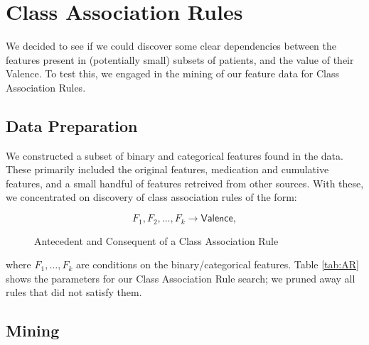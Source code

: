 \chapter{Class Association Rules}\label{sec:assoc-rules} 
 
 We decided to see if we could discover
 some clear dependencies between the features present in
 (potentially small) subsets
 of patients, and the value of their \textsf{Valence}. To test this, we engaged in the mining of our feature data 
 for Class Association Rules.
 
 \section{Data Preparation}
 
 We constructed a subset of binary and categorical features found in the data.
 These primarily included the original features, medication and cumulative
 features, and a small handful of features retreived from other sources.
 With these, we concentrated on discovery of class association rules
 of the form:
 
 \begin{figure}[H]
 $$ F_1,F_2,\ldots, F_k\longrightarrow \mathsf{Valence},$$
 \caption{Antecedent and Consequent of a Class Association Rule}
 \end{figure}

\noindent where $F_1,\ldots, F_k$ are conditions on the binary/categorical features. Table \ref{tab:AR}
shows the parameters for our Class Association Rule search; we pruned away all rules that
did not satisfy them.


\section{Mining}


